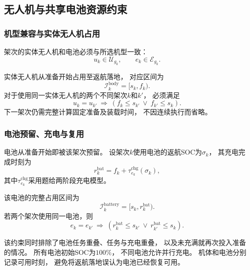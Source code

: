\documentclass[bwprint]{gmcmthesis}
\begin{document}
\subsection{无人机与共享电池资源约束}

\subsubsection{机型兼容与实体无人机占用}

架次的实体无人机和电池必须与所选机型一致：
\begin{equation}
    u_k\in\mathcal{U}_{g_k},
    \qquad
    e_k\in\mathcal{E}_{g_k}.
\end{equation}

实体无人机从准备开始占用至返航落地，
对应区间为
\begin{equation}
    \mathcal{I}_k^{\mathrm{body}}=[s_k,f_k).
\end{equation}
对于使用同一实体无人机的两个不同架次$k$和$k'$，
必须满足
\begin{equation}
    u_k=u_{k'}
    \ \Longrightarrow\
    \left(
    f_k\leq s_{k'}
    \ \lor\
    f_{k'}\leq s_k
    \right).
\end{equation}
下一架次仍需完整计算固定准备及装载时间，
不因连续执行而省略。

\subsubsection{电池预留、充电与复用}

电池从准备开始即被该架次预留。
设架次$k$使用电池的返航SOC为$\sigma_k$，
其充电完成时刻为
\begin{equation}
    r_k^{\mathrm{bat}}
    =
    f_k+
    \tau_{e_k}^{\mathrm{chg}}(\sigma_k),
\end{equation}
其中$\tau_{e_k}^{\mathrm{chg}}$采用题给两阶段充电模型。

该电池的完整占用区间为
\begin{equation}
    \mathcal{I}_k^{\mathrm{battery}}
    =
    [s_k,r_k^{\mathrm{bat}}).
\end{equation}
若两个架次使用同一电池，则
\begin{equation}
    e_k=e_{k'}
    \ \Longrightarrow\
    \left(
    r_k^{\mathrm{bat}}\leq s_{k'}
    \ \lor\
    r_{k'}^{\mathrm{bat}}\leq s_k
    \right).
\end{equation}

该约束同时排除了电池任务重叠、任务与充电重叠，
以及未充满就再次投入准备的情况。
所有电池初始SOC为$100\%$，
不同电池允许并行充电。
机体和电池分别记录可用时刻，
避免将返航落地误认为电池已经恢复可用。
\end{document}
